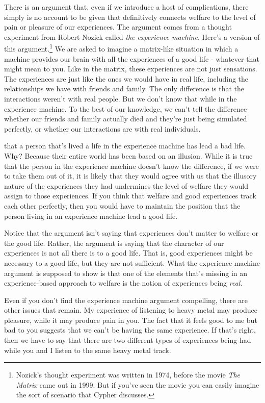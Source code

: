 \documentclass[]{tufte-book}
\begin{document}
There is an argument that, even if we introduce a host of complications, there simply is no account to be given that definitively connects welfare to the level of pain or pleasure of our experiences. The argument comes from a thought experiment from Robert Nozick called \emph{the experience machine}. Here's a version of this argument.\footnote{Nozick's thought experiment was written in 1974, before the movie \emph{The Matrix} came out in 1999. But if you've seen the movie you can easily imagine the sort of scenario that Cypher discusses.} We are asked to imagine a matrix-like situation in which a machine provides our brain with all the experiences of a good life - whatever that might mean to you. Like in the matrix, these experiences are not just sensations. The experiences are just like the ones we would have in real life, including the relationships we have with friends and family. The only difference is that the interactions weren't with real people. But we don't know that while in the experience machine. To the best of our knowledge, we can't tell the difference whether our friends and family actually died and they're just being simulated perfectly, or whether our interactions are with real individuals.

 that a person that's lived a life in the experience machine has lead a bad life. Why? Because their entire world has been based on an illusion. While it is true that the person in the experience machine doesn't know the difference, if we were to take them out of it, it is likely that they would agree with us that the illusory nature of the experiences they had undermines the level of welfare they would assign to those experiences. If you think that welfare and good experiences track each other perfectly, then you would have to maintain the position that the person living in an experience machine lead a good life.

Notice that the argument isn't saying that experiences don't matter to welfare or the good life. Rather, the argument is saying that the character of our experiences is not all there is to a good life. That is, good experiences might be necessary to a good life, but they are not sufficient. What the experience machine argument is supposed to show is that one of the elements that's missing in an experience-based approach to welfare is the notion of experiences being \emph{real}.

Even if you don't find the experience machine argument compelling, there are other issues that remain. My experience of listening to heavy metal may produce pleasure, while it may produce pain in you. The fact that it feels good to me but bad to you suggests that we can't be having the same experience. If that's right, then we have to say that there are two different types of experiences being had while you and I listen to the same heavy metal track.
\end{document}
